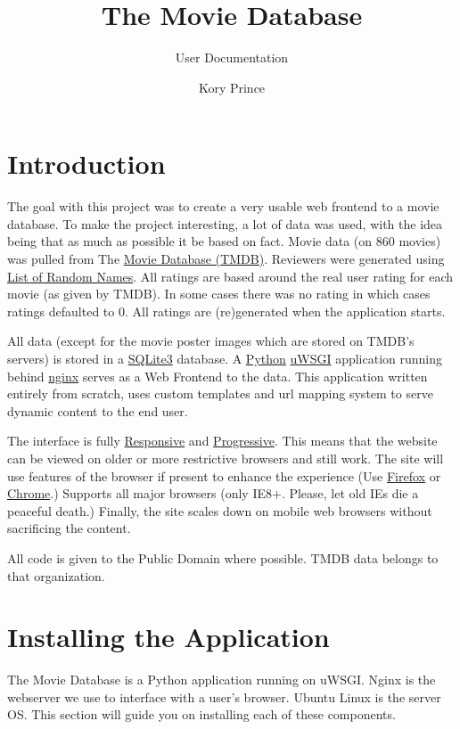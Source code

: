 \documentclass[10pt,a4paper]{scrreprt}
\author{Kory Prince}
\title{The Movie Database}
\subtitle{User Documentation}
\date{}
\begin{document}
\maketitle
\tableofcontents

\chapter{Introduction}
The goal with this project was to create a very usable web frontend to a movie database. To make the project interesting, a lot of data was used, with the idea being that as much as possible it be based on fact. Movie data (on 860 movies) was pulled from The \href{http://www.themoviedb.org/}{Movie Database (TMDB)}. Reviewers were generated using \href{http://listofrandomnames.com/}{List of Random Names}. All ratings are based around the real user rating for each movie (as given by TMDB). In some cases there was no rating in which cases ratings defaulted to 0. All ratings are (re)generated when the application starts.

All data (except for the movie poster images which are stored on TMDB's servers) is stored in a \href{http://www.sqlite.org/}{SQLite3} database. A \href{http://www.python.org/}{Python} \href{http://uwsgi-docs.readthedocs.org/en/latest/}{uWSGI} application running behind \href{http://wiki.nginx.org/Main}{nginx} serves as a Web Frontend to the data. This application written entirely from scratch, uses custom templates and url mapping system to serve dynamic content to the end user.

The interface is fully \href{http://en.wikipedia.org/wiki/Responsive_web_design}{Responsive} and \href{http://en.wikipedia.org/wiki/Progressive_enhancement}{Progressive}. This means that the website can be viewed on older or more restrictive browsers and still work. The site will use features of the browser if present to enhance the experience (Use \href{http://www.mozilla.org/en-US/firefox/fx/#desktop}{Firefox} or \href{http://www.google.com/chrome/}{Chrome}.) Supports all major browsers (only IE8+. Please, let old IEs die a peaceful death.) Finally, the site scales down on mobile web browsers without sacrificing the content.

All code is given to the Public Domain where possible. TMDB data belongs to that organization.

\chapter{Installing the Application}
The Movie Database is a Python application running on uWSGI. Nginx is the webserver we use to interface with a user's browser. Ubuntu Linux is the server OS. This section will guide you on installing each of these components.
\end{document}
